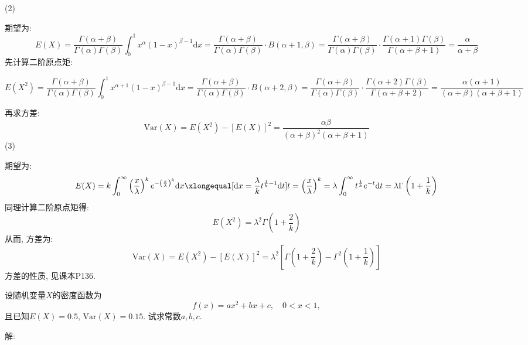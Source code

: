 \documentclass[standard]{ExBook}
\begin{document}
\begin{qitems}
\vspace{-5em}

    \begin{bbox}
(2)

期望为:
$$E(X)=\displaystyle\frac{\Gamma(\alpha+\beta)}{\Gamma(\alpha)\Gamma(\beta)}\int_{0}^{1}x^{\alpha}(1-x)^{\beta-1}\mathrm{d}x=\frac{\Gamma(\alpha+\beta)}{\Gamma(\alpha)\Gamma(\beta)}\cdot B(\alpha+1,\beta)=\frac{\Gamma(\alpha+\beta)}{\Gamma(\alpha)\Gamma(\beta)} \cdot \frac{\Gamma(\alpha+1)\Gamma(\beta)}{\Gamma(\alpha+\beta+1)}=\frac{\alpha}{\alpha+\beta}$$
先计算二阶原点矩:
\begin{small}
$$E(X^2)=\displaystyle\frac{\Gamma(\alpha+\beta)}{\Gamma(\alpha)\Gamma(\beta)}\int_{0}^{1}x^{\alpha+1}(1-x)^{\beta-1}\mathrm{d}x=\frac{\Gamma(\alpha+\beta)}{\Gamma(\alpha)\Gamma(\beta)}\cdot B(\alpha+2,\beta)=\frac{\Gamma(\alpha+\beta)}{\Gamma(\alpha)\Gamma(\beta)} \cdot \frac{\Gamma(\alpha+2)\Gamma(\beta)}{\Gamma(\alpha+\beta+2)}=\frac{\alpha(\alpha+1)}{(\alpha+\beta)(\alpha+\beta+1)}$$
\end{small}
再求方差:
$$\mathrm{Var}(X)=E(X^2)-\left[E(X)\right]^2=\frac{\alpha\beta}{(\alpha+\beta)^2 (\alpha+\beta+1)}$$
(3)

期望为:
$$E(X)=\displaystyle k\int_{0}^{\infty}\left(\frac{x}{\lambda}\right)^{k}e^{-\left(\frac{x}{\lambda}\right)^{k}}\mathrm{d}x \xlongequal[\mathrm{d}x=\frac{\lambda}{k}t^{\frac{1}{k}-1}\mathrm{d}t]{t=\left(\frac{x}{\lambda}\right)^k}=\lambda\int_{0}^{\infty}t^{\frac{1}{k}}e^{-t}\mathrm{d}t=\lambda\Gamma\left(1+\frac{1}{k}\right)$$
同理计算二阶原点矩得:
$$E(X^2)=\lambda^2\Gamma\left(1+\frac{2}{k}\right)$$
从而, 方差为:
$$\mathrm{Var}(X)=E(X^2)-\left[E(X)\right]^2=\lambda^2\left[\Gamma\left(1+\frac{2}{k}\right)-\Gamma^2\left(1+\frac{1}{k}\right)\right]$$
\textcolor{themeColor}{\selectfont {}
方差的性质, 见课本P136.}
    \end{bbox}

\vspace{-5em}

    \begin{bbox}
    \begin{shaded}
        \qitem
设随机变量$X$的密度函数为
$$f(x)=ax^2+bx+c,\quad 0<x<1,$$
且已知$E(X)=0.5$, $\mathrm{Var}(X)=0.15$. 试求常数$a,b,c$.
    \end{shaded}
    \end{bbox}

\vspace{-5em}

    \begin{bbox}
解: 


\end{bbox}
\end{qitems}
\end{document}
